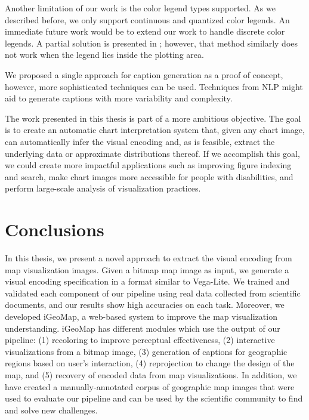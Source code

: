 Another limitation of our work is the color legend types supported. As we described before, we only support continuous and quantized color legends. An immediate future work would be to extend our work to handle discrete color legends. A partial solution is presented in \citep{Poco2017a}; however, that method similarly does not work when the legend lies inside the plotting area. 


We proposed a single approach for caption generation as a proof of concept, however, more sophisticated techniques can be used.
Techniques from \ac{NLP} might aid to generate captions with more variability and complexity.


The work presented in this thesis is part of a more ambitious objective. The goal is to create an automatic chart interpretation system that, given any chart image, can automatically infer the visual encoding and, as is feasible, extract the underlying data or approximate distributions thereof. If we accomplish this goal, we could create more impactful applications such as improving figure indexing and search, make chart images more accessible for people with disabilities, and perform large-scale analysis of visualization practices.


\section{Conclusions}
\label{sec:conclusions}

In this thesis, we present a novel approach to extract the visual encoding from map visualization images. Given a bitmap map image as input, we generate a visual encoding specification in a format similar to Vega-Lite. We trained and validated each component of our pipeline using real data collected from scientific documents, and our results show high accuracies on each task. Moreover, we developed iGeoMap, a web-based system to improve the map visualization understanding. iGeoMap has different modules which use the output of our pipeline: (1) recoloring to improve perceptual effectiveness, (2) interactive visualizations from a bitmap image, (3) generation of captions for geographic regions based on user's interaction, (4) reprojection to change the design of the map, and (5) recovery of encoded data from map visualizations. In addition, we have created a manually-annotated corpus of geographic map images that were used to evaluate our pipeline and can be used by the scientific community to find and solve new challenges.
